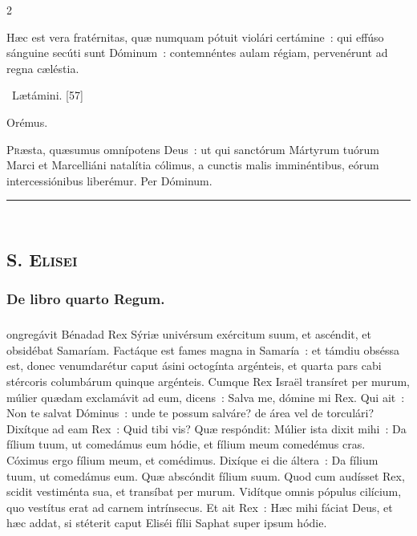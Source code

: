 \documentclass[9pt,twoside]{extarticle}
\begin{document}
\begin{multicols}{2}
\begin{tightlist}{}
\item {} Hæc est vera fratérnitas, quæ numquam pótuit violári certámine~: qui effúso sánguine secúti sunt Dóminum~: contemnéntes aulam régiam, pervenérunt ad regna cæléstia.
\item {}~Lætámini. [57]
\item Orémus. \hfill {}
\end{tightlist}
\lettrine{P}ræsta, quæsumus omnípotens Deus~: ut qui sanctórum Mártyrum tuórum Marci et Marcelliáni natalítia cólimus, a cunctis malis imminéntibus, eórum intercessiónibus liberémur. Per Dóminum.

\begin{center}\textcolor{red}{\rule{\linewidth}{0.5pt}} \end{center}

\subsection*{\center \textsc{\\
S. Elisei}}
\subsubsection*{\center {}}

\subsubsection*{\center De libro quarto Regum.}
\subsubsection*{\center {}}
ongregávit Bénadad Rex Sýriæ univérsum exércitum suum, et ascéndit, et obsidébat Samaríam.
Factáque est fames magna in Samaría~: et támdiu obséssa est, donec venumdarétur caput ásini octogínta argénteis, et quarta pars cabi stércoris columbárum quinque argénteis.
Cumque Rex Israël transíret per murum, múlier quædam exclamávit ad eum, dicens~: Salva me, dómine mi Rex.
Qui ait~: Non te salvat Dóminus~: unde te possum salváre? de área vel de torculári? Dixítque ad eam Rex~: Quid tibi vis? Quæ respóndit:
Múlier ista dixit mihi~: Da fílium tuum, ut comedámus eum hódie, et fílium meum comedémus cras.
Cóximus ergo fílium meum, et comédimus. Dixíque ei die áltera~: Da fílium tuum, ut comedámus eum. Quæ abscóndit fílium suum.
Quod cum audísset Rex, scidit vestiménta sua, et transíbat per murum. Vidítque omnis pópulus cilícium, quo vestítus erat ad carnem intrínsecus.
Et ait Rex~: Hæc mihi fáciat Deus, et hæc addat, si stéterit caput Eliséi fílii Saphat super ipsum hódie.


\end{multicols}
\end{document}
